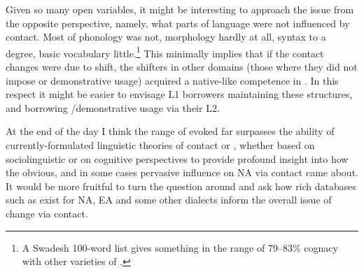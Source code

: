 \documentclass[output=paper]{langsci/langscibook}
\begin{document}
Given so many open variables, it might be interesting to approach the issue from the opposite perspective, namely, what parts of language were not influenced by contact. Most of phonology was not, morphology hardly at all, syntax to a degree, basic vocabulary little.\footnote{A Swadesh 100-word list gives something in the range of 79–83\% cognacy with   other varieties of .} This minimally implies that if the contact changes were due to shift, the shifters in other domains (those where they did not impose  or demonstrative usage) acquired a native-like competence in . In this respect it might be easier to envisage L1  borrowers maintaining these structures, and borrowing /demonstrative usage via their L2.

At the end of the day I think the range of  evoked far surpasses the ability of currently-formulated linguistic theories of contact or , whether based on sociolinguistic or on cognitive perspectives \citep[523]{Lucas2015} to provide profound insight into how the obvious, and in some cases pervasive influence on NA via contact came about. It would be more fruitful to turn the question around and ask how rich databases such as exist for NA, EA and some other  dialects inform the overall issue of change via contact.
\end{document}
